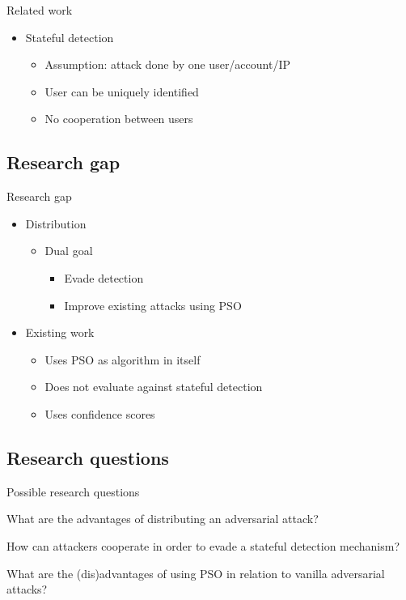 \documentclass[11pt,t]{beamer}
\begin{document}
\begin{frame}{Related work}
\begin{itemize}
	\item Stateful detection
	\begin{itemize}
		\item Assumption: attack done by \alert{one} user/account/IP
		\item User can be uniquely identified
		\item No cooperation between users
	\end{itemize}
\end{itemize}
\end{frame}

\subsection{Research gap}
\begin{frame}{Research gap}
\begin{itemize}	
	\item Distribution
	\begin{itemize}
		\item Dual goal
		\begin{itemize}
			\item Evade detection
			\item Improve existing attacks using PSO
		\end{itemize}
	\end{itemize}
	
	\item Existing work
	\begin{itemize}
		\item Uses PSO as algorithm in itself
		\item Does not evaluate against stateful detection 
		\item Uses confidence scores \cite{10.1007/978-3-030-59013-0_22, s20247158}
	\end{itemize}
\end{itemize}
\end{frame}

\subsection{Research questions}
\begin{frame}{Possible research questions}
\begin{exampleblock}
	{What are the advantages of distributing an adversarial attack?}
	\end{exampleblock}
	
	\begin{exampleblock}
	{How can attackers cooperate in order to evade a stateful detection mechanism?}
	\end{exampleblock}
	
	\begin{exampleblock}
	{What are the (dis)advantages of using PSO in relation to vanilla adversarial attacks?}
	\end{exampleblock}
\end{frame}
\end{document}

